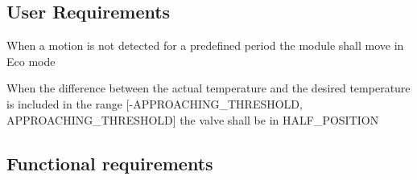 \subsection{User Requirements}
\begin{req_enum}
	\item When a motion is not detected for a predefined period the module shall move in Eco mode
	\item When the difference between the actual temperature and the desired temperature is included in the range 
	[-APPROACHING\_THRESHOLD, APPROACHING\_THRESHOLD] the valve shall be in HALF\_POSITION
\end{req_enum}

\subsection{Functional requirements}

